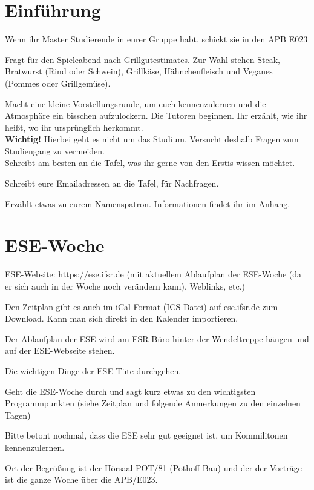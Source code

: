 \documentclass[a4paper,12pt]{report}
\begin{document}
\section{Einführung}
\begin{itemize*}
\item Wenn ihr Master Studierende in eurer Gruppe habt, schickt sie in den APB E023
\item Fragt für den Spieleabend nach Grillgutestimates. Zur Wahl stehen Steak, Bratwurst (Rind oder Schwein), Grillkäse, Hähnchenfleisch und Veganes (Pommes oder Grillgemüse).
\item Macht eine kleine Vorstellungsrunde, um euch kennenzulernen und die Atmosphäre ein bisschen aufzulockern.
Die Tutoren beginnen. Ihr erzählt, wie ihr heißt, wo ihr ursprünglich herkommt.\\
\textbf{Wichtig!} Hierbei geht es nicht um das Studium. Versucht deshalb Fragen zum Studiengang zu vermeiden.\\
Schreibt am besten an die Tafel, was ihr gerne von den Erstis wissen möchtet.
\item Schreibt eure Emailadressen an die Tafel, für Nachfragen.
\item Erzählt etwas zu eurem Namenspatron. Informationen findet ihr im Anhang.
\end{itemize*}

\section{ESE-Woche}
\begin{itemize*}
\item ESE-Website: https://ese.ifsr.de (mit aktuellem Ablaufplan der ESE-Woche (da er sich auch in der Woche noch verändern kann), Weblinks, etc.)
\item Den Zeitplan gibt es auch im iCal-Format (ICS Datei) auf ese.ifsr.de zum Download.
Kann man sich direkt in den Kalender importieren.
\item Der Ablaufplan der ESE wird am FSR-Büro hinter der Wendeltreppe hängen und auf der ESE-Webseite stehen.
\item Die wichtigen Dinge der ESE-Tüte durchgehen.
\item Geht die ESE-Woche durch und sagt kurz etwas zu den wichtigsten Programmpunkten (siehe Zeitplan und folgende Anmerkungen zu den einzelnen Tagen)
\item Bitte betont nochmal, dass die ESE sehr gut geeignet ist, um Kommilitonen kennenzulernen.
\end{itemize*}
Ort der Begrüßung ist der Hörsaal POT/81 (Pothoff-Bau) und der der Vorträge ist die ganze Woche über die APB/E023.
\end{document}
